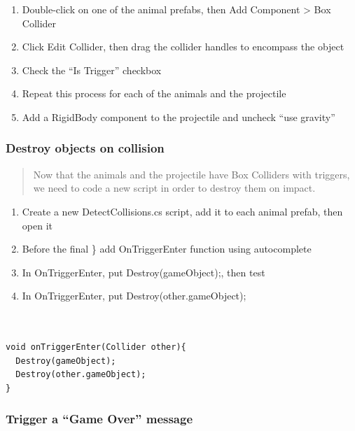 \documentclass[
]{book}
\providecommand{\tightlist}{%
  \setlength{\itemsep}{0pt}\setlength{\parskip}{0pt}}
\begin{document}
\begin{enumerate}
\def\labelenumi{\arabic{enumi}.}
\tightlist
\item
  Double-click on one of the animal prefabs, then Add Component \textgreater{} Box Collider
\item
  Click Edit Collider, then drag the collider handles to encompass the object
\item
  Check the ``Is Trigger'' checkbox
\item
  Repeat this process for each of the animals and the projectile
\item
  Add a RigidBody component to the projectile and uncheck ``use gravity''
\end{enumerate}

\hypertarget{destroy-objects-on-collision}{%
\subsubsection{Destroy objects on collision}\label{destroy-objects-on-collision}}

\begin{quote}
Now that the animals and the projectile have Box Colliders with triggers, we need to code a new script in order to destroy them on impact.
\end{quote}

\begin{enumerate}
\def\labelenumi{\arabic{enumi}.}
\tightlist
\item
  Create a new DetectCollisions.cs script, add it to each animal prefab, then open it
\item
  Before the final \} add OnTriggerEnter function using autocomplete
\item
  In OnTriggerEnter, put Destroy(gameObject);, then test
\item
  In OnTriggerEnter, put Destroy(other.gameObject);
\end{enumerate}

\begin{verbatim}


void onTriggerEnter(Collider other){
  Destroy(gameObject);
  Destroy(other.gameObject);
}
\end{verbatim}

\hypertarget{trigger-a-game-over-message}{%
\subsubsection{Trigger a ``Game Over'' message}\label{trigger-a-game-over-message}}
\end{document}
